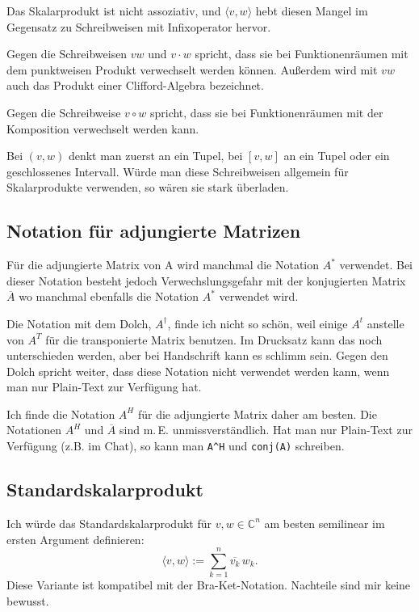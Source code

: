 \documentclass[a4paper,11pt,fleqn]{article}
\begin{document}
Das Skalarprodukt ist nicht assoziativ, und $\langle v,w\rangle$
hebt diesen Mangel im Gegensatz zu Schreibweisen mit Infixoperator
hervor.

Gegen die Schreibweisen $vw$ und $v\cdot w$ spricht, dass sie
bei Funktionenräumen mit dem punktweisen Produkt verwechselt
werden können. Außerdem wird mit $vw$ auch das Produkt einer
Clifford-Algebra bezeichnet.

Gegen die Schreibweise $v\circ w$ spricht, dass sie bei
Funktionenräumen mit der Komposition verwechselt werden kann.

Bei $(v,w)$ denkt man zuerst an ein Tupel, bei $[v,w]$
an ein Tupel oder ein geschlossenes Intervall. Würde man diese
Schreibweisen allgemein für Skalarprodukte verwenden, so wären sie
stark überladen.

\subsection{Notation für adjungierte Matrizen}
Für die adjungierte Matrix von A wird manchmal die Notation $A^*$
verwendet. Bei dieser Notation besteht jedoch Verwechslungsgefahr mit
der konjugierten Matrix $\overline{A}$ wo manchmal ebenfalls die
Notation $A^*$ verwendet wird. 

Die Notation mit dem Dolch, $A^\dagger$, finde ich nicht so schön,
weil einige $A^t$ anstelle von $A^T$ für die transponierte Matrix
benutzen. Im Drucksatz kann das noch unterschieden werden,
aber bei Handschrift kann es schlimm sein.
Gegen den Dolch spricht weiter, dass diese Notation nicht
verwendet werden kann, wenn man nur Plain-Text zur Verfügung
hat.

Ich finde die Notation $A^H$ für die adjungierte Matrix daher
am besten. Die Notationen $A^H$ und $\overline{A}$ sind m.\,E.
unmissverständlich. Hat man nur Plain-Text zur Verfügung
(z.B. im Chat), so kann man \verb|A^H| und \verb|conj(A)|
schreiben.

\subsection{Standardskalarprodukt}
Ich würde das Standardskalarprodukt für $v,w\in\mathbb C^n$
am besten semilinear im ersten Argument definieren:
\begin{equation}
\langle v,w\rangle := \sum_{k=1}^{n} \overline{v_k}\,w_k.
\end{equation}
Diese Variante ist kompatibel mit der Bra-Ket-Notation.
Nachteile sind mir keine bewusst.
\end{document}
